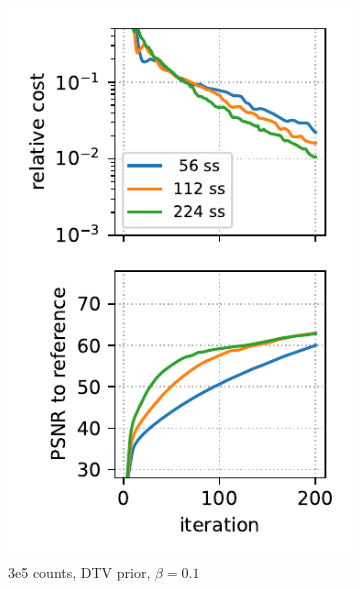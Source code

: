 \begin{figure}
\begin{subfigure}[b]{0.23\textwidth}
    \includegraphics[width=1.0\textwidth]{./figs/brain2d_counts_3.0E+05_seed_1_beta_1.0E-01_prior_DTV_niter_ref_20000_fwhm_4.5_4.5_niter_200_ss.pdf}
    \caption{3e5 counts, DTV prior, $\beta = 0.1$}
  \end{subfigure}
  \hfill
  \begin{subfigure}[b]{0.23\textwidth}
    \centering

\end{subfigure}
\end{figure}
